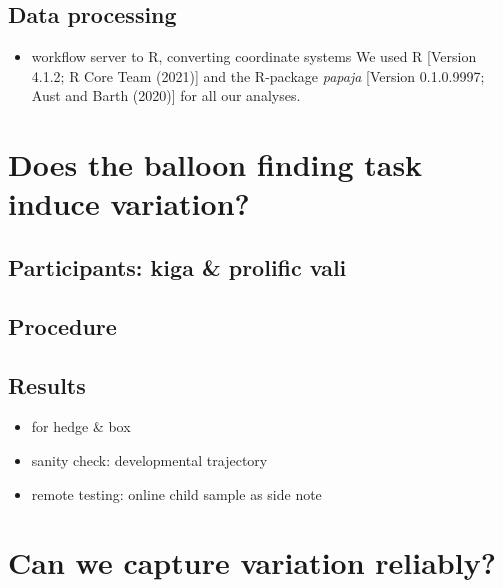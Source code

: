 \documentclass[
  english,
  man,floatsintext]{apa6}
\providecommand{\tightlist}{%
  \setlength{\itemsep}{0pt}\setlength{\parskip}{0pt}}
\begin{document}
\hypertarget{data-processing-1}{%
\subsection{Data processing}\label{data-processing-1}}

\begin{itemize}
\tightlist
\item
  workflow server to R, converting coordinate systems
  We used R {[}Version 4.1.2; R Core Team (2021){]} and the R-package \emph{papaja} {[}Version 0.1.0.9997; Aust and Barth (2020){]} for all our analyses.
\end{itemize}

\hypertarget{does-the-balloon-finding-task-induce-variation}{%
\section{Does the balloon finding task induce variation?}\label{does-the-balloon-finding-task-induce-variation}}

\hypertarget{participants-kiga-prolific-vali-1}{%
\subsection{Participants: kiga \& prolific vali}\label{participants-kiga-prolific-vali-1}}

\hypertarget{procedure-1}{%
\subsection{Procedure}\label{procedure-1}}

\hypertarget{results-3}{%
\subsection{Results}\label{results-3}}

\begin{itemize}
\tightlist
\item
  for hedge \& box
\item
  sanity check: developmental trajectory
\item
  remote testing: online child sample as side note
\end{itemize}

\hypertarget{can-we-capture-variation-reliably}{%
\section{Can we capture variation reliably?}\label{can-we-capture-variation-reliably}}
\end{document}
